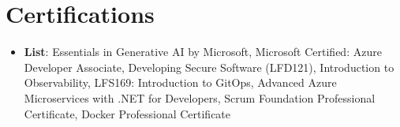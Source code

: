 \documentclass[letterpaper,11pt]{article}
\newcommand{\resumeItem}[2]{
  \item\small{
    \textbf{#1}{: #2 \vspace{-2pt}}
  }
}
\newcommand{\resumeSubItem}[2]{\resumeItem{#1}{#2}\vspace{-4pt}}
\newcommand{\resumeSubHeadingListStart}{\begin{itemize}[leftmargin=*]}
\newcommand{\resumeSubHeadingListEnd}{\end{itemize}}
\begin{document}
 \section{Certifications}
  \resumeSubHeadingListStart
    \resumeSubItem{List}
      {Essentials in Generative AI by Microsoft, Microsoft Certified: Azure Developer Associate, Developing Secure Software (LFD121), Introduction to Observability, LFS169: Introduction to GitOps, Advanced Azure Microservices with .NET for Developers, Scrum Foundation Professional Certificate, Docker Professional Certificate}
    \resumeSubHeadingListEnd
\end{document}
